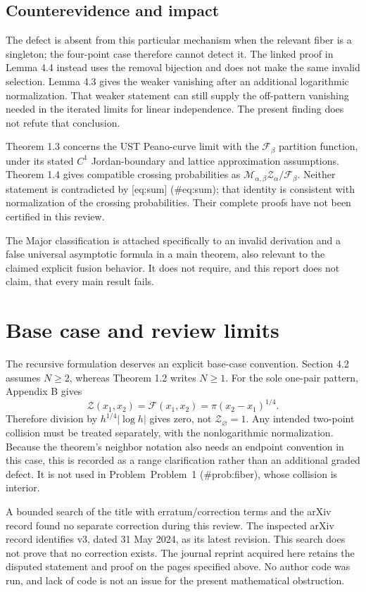 \documentclass[10pt]{article}
\begin{document}
\subsection*{Counterevidence and impact}
The defect is absent from this particular mechanism when the relevant fiber is a singleton; the four-point case therefore cannot detect it. The linked proof in Lemma 4.4 instead uses the removal bijection and does not make the same invalid selection. Lemma 4.3 gives the weaker vanishing after an additional logarithmic normalization. That weaker statement can still supply the off-pattern vanishing needed in the iterated limits for linear independence. The present finding does not refute that conclusion.\par
Theorem 1.3 concerns the UST Peano-curve limit with the \(\mathcal F_\beta\) partition function, under its stated \(C^1\) Jordan-boundary and lattice approximation assumptions. Theorem 1.4 gives compatible crossing probabilities as \(\mathcal M_{\alpha,\beta}\mathcal Z_\alpha/\mathcal F_\beta\). Neither statement is contradicted by [eq:sum] (\#eq:sum); that identity is consistent with normalization of the crossing probabilities. Their complete proofs have not been certified in this review.\par
The Major classification is attached specifically to an invalid derivation and a false universal asymptotic formula in a main theorem, also relevant to the claimed explicit fusion behavior. It does not require, and this report does not claim, that every main result fails.\par
\section*{Base case and review limits}
The recursive formulation deserves an explicit base-case convention. Section 4.2 assumes \(N\ge2\), whereas Theorem 1.2 writes \(N\ge1\). For the sole one-pair pattern, Appendix B gives \[\mathcal Z(x_1,x_2)=\mathcal F(x_1,x_2)=\pi(x_2-x_1)^{1/4}.\] Therefore division by \(h^{1/4}|\log h|\) gives zero, not \(\mathcal Z_\varnothing=1\). Any intended two-point collision must be treated separately, with the nonlogarithmic normalization. Because the theorem’s neighbor notation also needs an endpoint convention in this case, this is recorded as a range clarification rather than an additional graded defect. It is not used in Problem Problem 1 (\#prob:fiber), whose collision is interior.\par
A bounded search of the title with erratum/correction terms and the arXiv record found no separate correction during this review. The inspected arXiv record identifies v3, dated 31 May 2024, as its latest revision. This search does not prove that no correction exists. The journal reprint acquired here retains the disputed statement and proof on the pages specified above. No author code was run, and lack of code is not an issue for the present mathematical obstruction.\par
\end{document}
